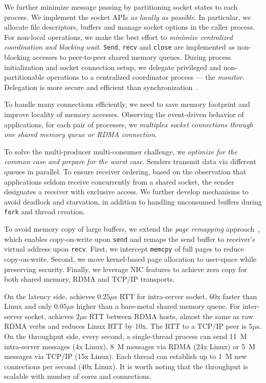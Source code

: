 We further minimize message passing by partitioning socket states to each process. We implement the socket APIs \textit{as locally as possible}. In particular, we allocate file descriptors, buffers and manage socket options in the caller process. For non-local operations, we make the best effort to \textit{minimize centralized coordination and blocking wait}. \texttt{Send}, \texttt{recv} and \texttt{close} are implemented as non-blocking accesses to peer-to-peer shared memory queues. During process initialization and socket connection setup, we delegate privileged and non-partitionable operations to a centralized coordinator process --- the \textit{monitor}. Delegation is more secure and efficient than synchronization~\cite{roghanchi2017ffwd}.

To handle many connections efficiently, we need to save memory footprint and improve locality of memory accesses. Observing the event-driven behavior of applications, for each pair of processes, we \textit{multiplex socket connections through one shared memory queue or RDMA connection}. %

To solve the multi-producer multi-consumer challenge, we \textit{optimize for the common case and prepare for the worst case}. Senders transmit data via different queues in parallel. To ensure receiver ordering, based on the observation that applications seldom receive concurrently from a shared socket, the sender designates a receiver with exclusive access. We further develop mechanisms to avoid deadlock and starvation, in addition to handling unconsumed buffers during \texttt{fork} and thread creation.

To avoid memory copy of large buffers, we extend the \textit{page remapping} approach~\cite{thadani1995efficient,chu1996zero}, which enables copy-on-write upon \texttt{send} and remaps the send buffer to receiver's virtual address upon \texttt{recv}. First, we intercept \texttt{memcpy} of full pages to reduce copy-on-write. Second, we move kernel-based page allocation to user-space while preserving security. Finally, we leverage NIC features to achieve zero copy for both shared memory, RDMA and TCP/IP transports.

On the latency side, \sys{} achieves $0.25\mu$s RTT for intra-server socket, 60x faster than Linux and only $0.05\mu$s higher than a bare-metal shared memory queue. For inter-server socket, \sys{} achieves $2\mu$s RTT between RDMA hosts, almost the same as raw RDMA verbs and reduces Linux RTT by 10x. The RTT to a TCP/IP peer is $5\mu$s. On the throughput side, every second, a single-thread process can send 11~M intra-server messages (4x Linux), 8~M messages via RDMA (24x Linux) or 5~M messages via TCP/IP (15x Linux). Each thread can establish up to 1~M new connections per second (40x Linux). It is worth noting that the throughput is scalable with number of cores and connections.


